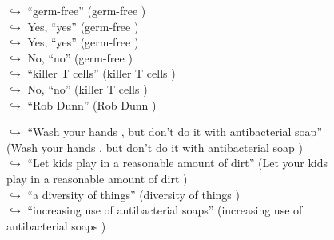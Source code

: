 \documentclass[11pt,a4paper, onecolumn]{article}
\begin{document}
\begin{figure}[t]
\begin{tcolorbox}[boxsep=0pt,left=5pt,right=0pt,top=2pt,colback = yellow!5]
\begin{dialogue}
\colorbox{pink!25}{$\hookrightarrow$}
{ ``germ-free'' (germ-free ) }
\\
\colorbox{pink!25}{$\hookrightarrow$}
\colorbox{red!25}{Yes,}
{ ``yes'' (germ-free ) }
\\
\colorbox{pink!25}{$\hookrightarrow$}
\colorbox{red!25}{Yes,}
{ ``yes'' (germ-free ) }
\\
\colorbox{pink!25}{$\hookrightarrow$}
\colorbox{red!25}{No,}
{ ``no'' (germ-free ) }
\\
\colorbox{pink!25}{$\hookrightarrow$}
{ ``killer T cells'' (killer T cells ) }
\\
\colorbox{pink!25}{$\hookrightarrow$}
\colorbox{red!25}{No,}
{ ``no'' (killer T cells ) }
\\
\colorbox{pink!25}{$\hookrightarrow$}
{ ``Rob Dunn'' (Rob Dunn ) }
 \end{dialogue}\end{tcolorbox}\end{figure}\begin{figure}[t] \small \begin{tcolorbox}[boxsep=0pt,left=5pt,right=0pt,top=2pt,colback = yellow!5] \begin{dialogue}
 \small 
\colorbox{pink!25}{$\hookrightarrow$}
{ ``Wash your hands , but don't do it with antibacterial soap'' (Wash your hands , but don't do it with antibacterial soap ) }
\\
\colorbox{pink!25}{$\hookrightarrow$}
{ ``Let kids play in a reasonable amount of dirt'' (Let your kids play in a reasonable amount of dirt ) }
\\
\colorbox{pink!25}{$\hookrightarrow$}
{ ``a diversity of things'' (diversity of things ) }
\\
\colorbox{pink!25}{$\hookrightarrow$}
{ ``increasing use of antibacterial soaps'' (increasing use of antibacterial soaps ) }
\\
 \end{dialogue}\end{tcolorbox}\end{figure}
\end{document}
